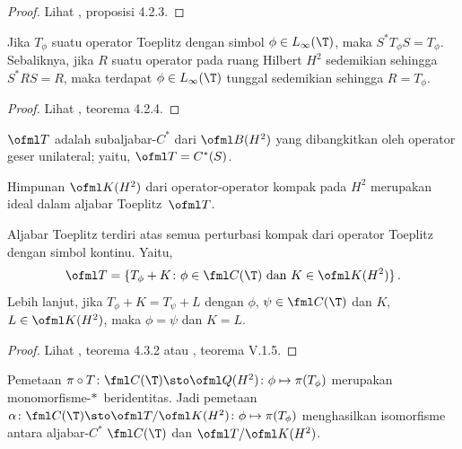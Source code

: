 \begin{proof} Lihat \cite{Arveson:2002}, proposisi 4.2.3.  \ns \end{proof}

\begin{prop} Jika $T_\phi$ suatu operator Toeplitz dengan simbol $\phi \in L_\infty(\T)$, maka
$S^*T_\phi S = T_\phi$. Sebaliknya, jika $R$ suatu operator pada ruang Hilbert $H^2$
sedemikian sehingga $S^*RS = R$, maka terdapat $\phi \in L_\infty(\T)$ tunggal sedemikian sehingga $R =
T_\phi$.
\end{prop}

\begin{proof} Lihat \cite{Arveson:2002}, teorema 4.2.4.  \ns \end{proof}

\begin{defn} 
 $\ofml T$ adalah subaljabar-$C^*$ dari $\ofml B(H^2)$ yang dibangkitkan oleh
operator geser unilateral; yaitu, $\ofml T = C^*(S)$.
\end{defn}

\begin{prop} Himpunan $\ofml K(H^2)$ dari operator-operator kompak pada $H^2$ merupakan ideal dalam aljabar
Toeplitz~$\ofml T$.
\end{prop}

\begin{prop} Aljabar Toeplitz terdiri atas semua perturbasi kompak dari operator Toeplitz
dengan simbol kontinu. Yaitu,
   \[ \ofml T = \{ T_\phi + K\colon \phi \in \fml C(\T) \text{ dan } K \in \ofml K(H^2)\} \,. \]
Lebih lanjut, jika $T_\phi + K = T_\psi + L$ dengan $\phi$, $\psi \in \fml C(\T)$ dan $K$, $L
\in \ofml K(H^2)$, maka $\phi = \psi$ dan $K = L$.
\end{prop}

\begin{proof} Lihat \cite{Arveson:2002}, teorema 4.3.2 atau \cite{Davidson:1996}, teorema V.1.5.
\ns \end{proof}

\begin{prop}\label{005251} Pemetaan $\pi \circ T\colon \fml C(\T) \sto \ofml Q(H^2)\colon \phi
\mapsto \pi(T_\phi)$ merupakan monomorfisme-$*\,$ beridentitas. Jadi pemetaan $\alpha\colon \fml C(\T)
\sto \ofml T/\ofml K(H^2)\colon \phi \mapsto \pi(T_\phi)$ menghasilkan isomorfisme
antara aljabar-$C^*$ $\fml C(\T)$ dan $\ofml T/\ofml K(H^2)$.
\end{prop}

